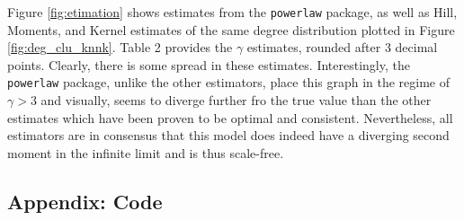 \documentclass{neu-assignment}
\begin{document}
Figure \ref{fig:etimation} shows estimates from the \texttt{powerlaw} package, as well as Hill, Moments, and Kernel estimates of the same degree distribution plotted in Figure \ref{fig:deg_clu_knnk}. Table 2 provides the $\gamma$ estimates, rounded after 3 decimal points. Clearly, there is some spread in these estimates. Interestingly, the \texttt{powerlaw} package, unlike the other estimators, place this graph in the regime of $\gamma > 3$ and visually, seems to diverge further fro the true value than the other estimates which have been proven to be optimal and consistent. Nevertheless, all estimators are in consensus that this model does indeed have a diverging second moment in the infinite limit and is thus scale-free. 

\subsection*{Appendix: Code}

\end{document}
